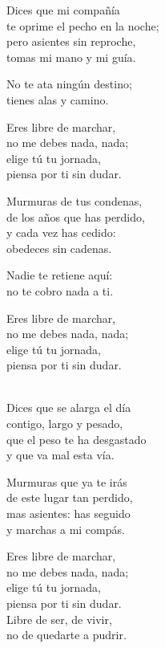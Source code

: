 \begin{lyrics}
Dices que mi compañía\\
te oprime el pecho en la noche;\\
pero asientes sin reproche,\\
tomas mi mano y mi guía.

No te ata ningún destino;\\
tienes alas y camino.

Eres libre de marchar,\\
no me debes nada, nada;\\
elige tú tu jornada,\\
piensa por ti sin dudar.

Murmuras de tus condenas,\\
de los años que has perdido,\\
y cada vez has cedido:\\
obedeces sin cadenas.

Nadie te retiene aquí:\\
no te cobro nada a ti.

Eres libre de marchar,\\
no me debes nada, nada;\\
elige tú tu jornada,\\
piensa por ti sin dudar.

\\
Dices que se alarga el día\\
contigo, largo y pesado,\\
que el peso te ha desgastado\\
y que va mal esta vía.

Murmuras que ya te irás\\
de este lugar tan perdido,\\
mas asientes: has seguido\\
y marchas a mi compás.

Eres libre de marchar,\\
no me debes nada, nada;\\
elige tú tu jornada,\\
piensa por ti sin dudar.\\
Libre de ser, de vivir,\\
no de quedarte a pudrir.
\end{lyrics}

